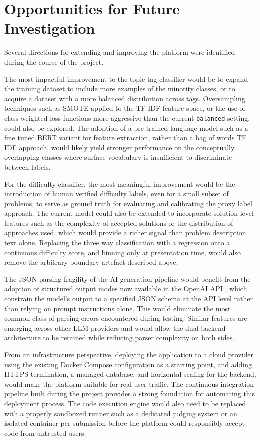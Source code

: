 \section{Opportunities for Future Investigation}

Several directions for extending and improving the platform were
identified during the course of the project.

The most impactful improvement to the topic tag classifier would be
to expand the training dataset to include more examples of the
minority classes, or to acquire a dataset with a more balanced
distribution across tags. Oversampling techniques such as SMOTE
\cite{chawla2002smote} applied to the TF IDF feature space, or the
use of class weighted loss functions more aggressive than the current
\texttt{balanced} setting, could also be explored. The adoption of a
pre trained language model such as a fine tuned BERT variant
\cite{devlin2019bert} for feature extraction, rather than a bag of
words TF IDF approach, would likely yield stronger performance on
the conceptually overlapping classes where surface vocabulary is
insufficient to discriminate between labels.

For the difficulty classifier, the most meaningful improvement would
be the introduction of human verified difficulty labels, even for a
small subset of problems, to serve as ground truth for evaluating and
calibrating the proxy label approach. The current model could also be
extended to incorporate solution level features such as the complexity
of accepted solutions or the distribution of approaches used, which
would provide a richer signal than problem description text alone.
Replacing the three way classification with a regression onto a
continuous difficulty score, and binning only at presentation time,
would also remove the arbitrary boundary artefact described above.

The JSON parsing fragility of the AI generation pipeline would benefit
from the adoption of structured output modes now available in the
OpenAI API \cite{openai2024structured}, which constrain the model's
output to a specified JSON schema at the API level rather than relying
on prompt instructions alone. This would eliminate the most common
class of parsing errors encountered during testing. Similar features
are emerging across other LLM providers and would allow the dual
backend architecture to be retained while reducing parser complexity
on both sides.

From an infrastructure perspective, deploying the application to a
cloud provider using the existing Docker Compose configuration as a
starting point, and adding HTTPS termination, a managed database, and
horizontal scaling for the backend, would make the platform suitable
for real user traffic. The continuous integration pipeline built
during the project provides a strong foundation for automating this
deployment process. The code execution engine would also need to be
replaced with a properly sandboxed runner such as a dedicated judging
system or an isolated container per submission before the platform
could responsibly accept code from untrusted users.

